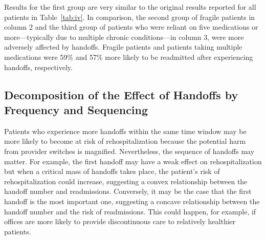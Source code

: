 \documentclass[final,12pt, notitlepage]{article}
\begin{document}
Results for the first group are very similar to the original results reported for all patients in Table~\ref{tab:iv}. In comparison, the second group of fragile patients in column 2 and the third group of patients who were reliant on five medications or more---typically due to multiple chronic conditions---in column 3, were more adversely affected by handoffs.
Fragile patients and patients taking multiple medications were 59\% and 57\% more likely to be readmitted after experiencing handoffs, respectively.


\subsection{Decomposition of the Effect of Handoffs by Frequency and Sequencing}
Patients who experience more handoffs within the same time window may be more likely to become at risk of rehospitalization because the potential harm from provider switches is magnified.
Nevertheless, the sequence of handoffs may matter.
For example, the first handoff may have a weak effect on rehospitalization but when a critical mass of handoffs takes place, the patient's risk of rehospitalization could increase, suggesting a convex relationship between the handoff number and readmissions.
Conversely, it may be the case that the first handoff is the most important one, suggesting a concave relationship between the handoff number and the risk of readmissions. This could happen, for example, if offices are more likely to provide discontinuous care to relatively healthier patients.

\end{document}
